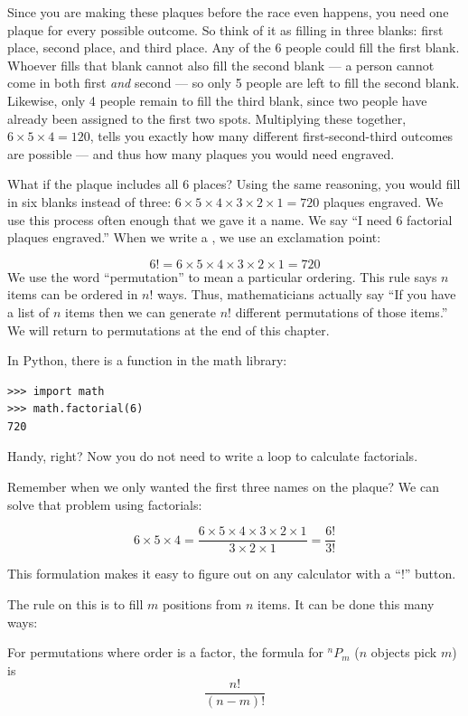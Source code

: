 
Since you are making these plaques before the race even happens, you need one
plaque for every possible outcome. So think of it as filling in three blanks:
first place, second place, and third place. Any of the 6 people could fill
the first blank. Whoever fills that blank cannot also fill the second blank
--- a person cannot come in both first \textit{and} second --- so only 5
people are left to fill the second blank. Likewise, only 4 people remain
to fill the third blank, since two people have already been assigned to
the first two spots. Multiplying these together, $6 \times 5 \times 4 =
120$, tells you exactly how many different first-second-third outcomes
are possible --- and thus how many plaques you would need engraved.

What if the plaque includes all 6 places?  Using the same reasoning, you would
fill in six blanks instead of three: $6 \times 5 \times 4 \times 3 \times 2
\times 1 = 720$ plaques engraved.  We use this process often enough that
we gave it a name.  We say ``I need 6 factorial plaques engraved.''  When
we write a , we use an exclamation point:

$$6! = 6 \times 5 \times 4 \times 3 \times 2 \times 1 = 720$$
We use the word ``permutation'' to mean a particular ordering.
This rule says $n$ items can be ordered in $n!$ ways. Thus,
mathematicians actually say ``If you have a list of $n$ items then we
can generate $n!$ different permutations of those items.'' We will return to permutations at the end of this chapter. 

In Python, there is a  function in the math library:
\begin{verbatim} 
>>> import math
>>> math.factorial(6)
720
\end{verbatim}

Handy, right? Now you do not need to write a loop to calculate factorials.

Remember when we only wanted the first three names on the plaque? We can solve that problem using factorials:

$$6 \times 5 \times 4 = \frac{6 \times 5 \times 4 \times 3 \times 2 \times 1}{3 \times 2 \times 1} = \frac{6!}{3!}$$

This formulation makes it easy to figure out on any calculator with a ``!'' button.

The rule on this is to fill $m$ positions from $n$ items. It can be done this many ways:
\begin{mdframed}[frametitle = {Permutations}, style = important]
For permutations where order is a factor, the formula for ${}^nP_m$ ($n$ objects pick $m$) is 
$$\frac{n!}{(n-m)!}$$
\end{mdframed}


